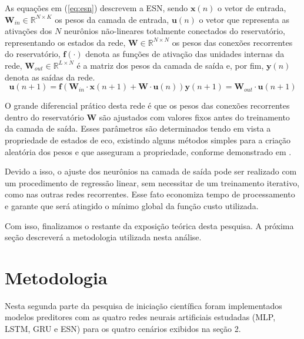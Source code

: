 \documentclass[a4paper, 12pt]{article}
\begin{document}
As equações em (\ref{eq:esn}) descrevem a ESN, sendo $\mathbf{x}(n)$ o vetor de entrada, $\mathbf{W}_{in} \in \mathbb{R}^{N \times K}$ os pesos da camada de entrada, $\mathbf{u}(n)$ o vetor que representa as ativações dos $N$ neurônios não-lineares totalmente conectados do reservatório, representando os estados da rede, $\mathbf{W} \in \mathbb{R}^{N \times N}$ os pesos das conexões recorrentes do reservatório, $\mathbf{f}(\cdot)$ denota as funções de ativação das unidades internas da rede, $\mathbf{W}_{out} \in \mathbb{R}^{L \times N}$ é a matriz dos pesos da camada de saída e, por fim, $\mathbf{y}(n)$ denota as saídas da rede.
\begin{subequations}\label{eq:esn}
\begin{equation}
\mathbf{u}(n+1) = \mathbf{f}(\mathbf{W}_{in} \cdot \mathbf{x}(n+1) + \mathbf{W} \cdot \mathbf{u}(n))
\end{equation}
\begin{equation}
\mathbf{y}(n+1) = \mathbf{W}_{out} \cdot \mathbf{u}(n+1)
\end{equation}
\end{subequations}

O grande diferencial prático desta rede é que os pesos das conexões recorrentes dentro do reservatório $\mathbf{W}$ são ajustados com valores fixos antes do treinamento da camada de saída. Esses parâmetros são determinados tendo em vista a propriedade de estados de eco, existindo alguns métodos simples para a criação aleatória dos pesos e que asseguram a propriedade, conforme demonstrado em \cite{jaeger2007echo}. 

Devido a isso, o ajuste dos neurônios na camada de saída pode ser realizado com um procedimento de regressão linear, sem necessitar de um treinamento iterativo, como nas outras redes recorrentes. Esse fato economiza tempo de processamento e garante que será atingido o mínimo global da função custo utilizada.

Com isso, finalizamos o restante da exposição teórica desta pesquisa. A próxima seção descreverá  a metodologia utilizada nesta análise.

\section{Metodologia}

Nesta segunda parte da pesquisa de iniciação científica foram implementados modelos preditores com as quatro redes neurais artificiais estudadas (MLP, LSTM, GRU e ESN) para os quatro cenários exibidos na seção 2. 
\end{document}
